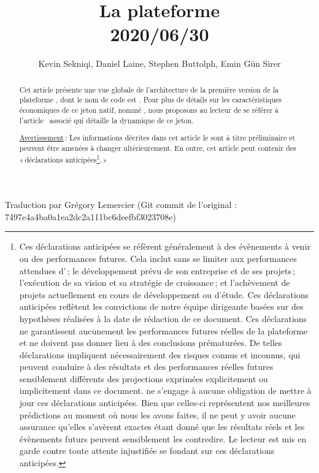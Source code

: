 \documentclass[runningheads,francais,a4paper]{llncs}
\begin{document}
\immediate{}

\title{La plateforme \AVAPlatformName{}\\2020/06/30} %
\author{Kevin Sekniqi, Daniel Laine, Stephen Buttolph, Emin G{\"u}n Sirer}
\institute{}

\maketitle

\begin{center}
  {\scriptsize Traduction par Grégory Lemercier (Git commit de l'original : 7497e4a4ba0a1ea2dc2a111bc6deefbf3023708e)}
\end{center}

\begin{abstract}
Cet article présente une vue globale de l'architecture de la première version de la plateforme \AVAPlatformName{}, dont
le nom de code est \AVAPlatformNameFirstRelease{}. Pour plus de détails sur les caractéristiques économiques de ce
jeton natif, nommé \AVATokenName{}, nous proposons au lecteur de se référer à l'article~\cite{avatokenpaper} associé qui
détaille la dynamique de ce jeton.

\underline{Avertissement}\,: Les informations décrites dans cet article le sont à titre préliminaire et peuvent être
amenées à changer ultérieurement. En outre, cet article peut contenir des «\,déclarations
anticipées\footnote{Ces déclarations anticipées se réfèrent généralement à des évènements à venir ou des performances futures.
  Cela inclut sans se limiter aux performances attendues d'\AVAPlatformName{}\,; le développement prévu de son entreprise et
de ses projets\,; l'exécution de sa vision et sa stratégie de croissance\,; et l'achèvement de projets actuellement en
cours de développement ou d'étude. Ces déclarations anticipées reflètent les convictions de notre équipe dirigeante
basées sur des hypothèses réalisées à la date de rédaction de ce document. Ces déclarations ne garantissent aucunement
les performances futures réelles de la plateforme et ne doivent pas donner lieu à des conclusions prématurées. De
telles déclarations impliquent nécessairement des risques connus et inconnus, qui peuvent conduire à des résultats et des
performances réelles futures sensiblement différents des projections exprimées explicitement ou implicitement dans ce
document. \AVAPlatformName{} ne s'engage à aucune obligation de mettre à jour ces déclarations anticipées. Bien que celles-ci
représentent nos meilleures prédictions au moment où nous les avons faites, il ne peut y avoir aucune assurance qu'elles
s'avèrent exactes étant donné que les résultats réels et les évènements futurs peuvent sensiblement les contredire. Le lecteur
est mis en garde contre toute attente injustifiée se fondant sur ces déclarations anticipées.}.\,»

\end{abstract}
\end{document}

